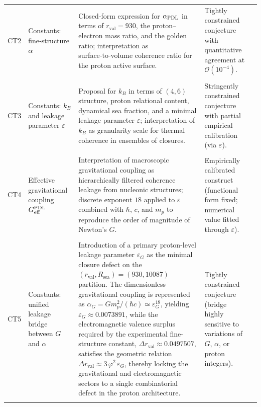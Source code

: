 \documentclass[11pt,a4paper]{article}
\newcommand{\PDL}{\textnormal{PDL}}
\begin{document}
\begin{longtable}{L{0.8cm}L{1.9cm}L{5.9cm}L{3cm}L{2.2cm}}
CT2 &
Constants: fine‑structure $\alpha$ &
Closed‑form expression for $\alpha_{\PDL}$ in terms of $r_{\mathrm{val}}=930$, the proton–electron mass ratio, and the golden ratio; interpretation as surface‑to‑volume coherence ratio for the proton active surface. &
Tightly constrained conjecture with quantitative agreement at $\mathcal{O}(10^{-4})$. &
\citep{Alpha_PDL_v2_2026,Born_Golden_v2_2026,PDL_intro,PDL_position} \\\\[0.4em]

CT3 &
Constants: $k_B$ and leakage parameter $\varepsilon$ &
Proposal for $k_B$ in terms of $(4,6)$ structure, proton relational content, dynamical sea fraction, and a minimal leakage parameter $\varepsilon$; interpretation of $k_B$ as granularity scale for thermal coherence in ensembles of closures. &
Stringently constrained conjecture with partial empirical calibration (via $\varepsilon$). &
\citep{PDL_Main_2026,Coherence_Leakage_18_2026,PDL_position} \\\\[0.4em]

CT4 &
Effective gravitational coupling $G_{\mathrm{eff}}^{\PDL}$ &
Interpretation of macroscopic gravitational coupling as hierarchically filtered coherence leakage from nucleonic structures; discrete exponent $18$ applied to $\varepsilon$ combined with $\hbar$, $c$, and $m_p$ to reproduce the order of magnitude of Newton’s $G$. &
Empirically calibrated construct (functional form fixed; numerical value fitted through $\varepsilon$). &
\citep{Exponent_18_PDL_2026,Coherence_Leakage_18_2026,PDL_Main_2026,PDL_position} \\\\[0.4em]

CT5 &
Constants: unified leakage bridge between $G$ and $\alpha$ &
Introduction of a primary proton-level leakage parameter $\varepsilon_G$ as the minimal closure defect on the $(r_{\mathrm{val}},R_{\mathrm{sea}})=(930,10087)$ partition. The dimensionless gravitational coupling is represented as $\alpha_G = G m_p^2 / (\hbar c) \simeq \varepsilon_G^{18}$, yielding $\varepsilon_G \approx 0.0073891$, while the electromagnetic valence surplus required by the experimental fine-structure constant, $\Delta r_{\mathrm{val}} \approx 0.0497507$, satisfies the geometric relation $\Delta r_{\mathrm{val}} \approx 3\,\varphi^2\,\varepsilon_G$, thereby locking the gravitational and electromagnetic sectors to a single combinatorial defect in the proton architecture. &
Tightly constrained conjecture (bridge highly sensitive to variations of $G$, $\alpha$, or proton integers). &
\citep{Exponent_18_PDL_2026,Alpha_PDL_v2_2026,Universal_Coherence_Leakage_V3_2026} \\\\[0.4em]



\end{longtable}
\end{document}
